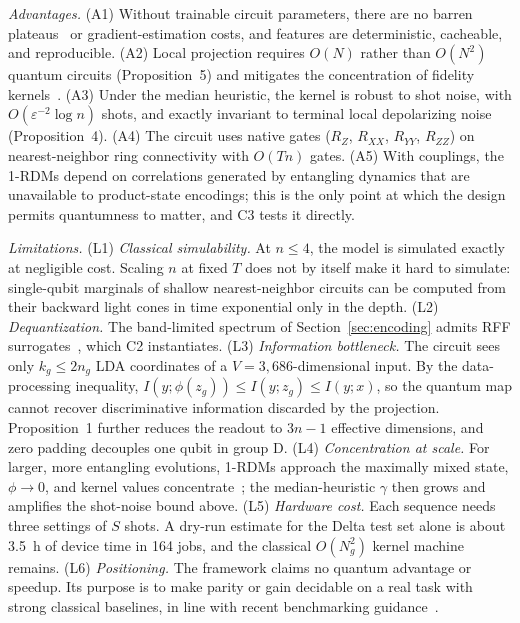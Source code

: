 \documentclass[conference]{IEEEtran}
\begin{document}
\textit{Advantages.} (A1) Without trainable circuit parameters, there are no barren plateaus~\cite{mcclean2018barren} or gradient-estimation costs, and features are deterministic, cacheable, and reproducible. (A2) Local projection requires $O(N)$ rather than $O(N^2)$ quantum circuits (Proposition~5) and mitigates the concentration of fidelity kernels~\cite{huang2021power}. (A3) Under the median heuristic, the kernel is robust to shot noise, with $O(\varepsilon^{-2}\log n)$ shots, and exactly invariant to terminal local depolarizing noise (Proposition~4). (A4) The circuit uses native gates ($R_Z$, $R_{XX}$, $R_{YY}$, $R_{ZZ}$) on nearest-neighbor ring connectivity with $O(Tn)$ gates. (A5) With couplings, the 1-RDMs depend on correlations generated by entangling dynamics that are unavailable to product-state encodings; this is the only point at which the design permits quantumness to matter, and C3 tests it directly.

\textit{Limitations.} (L1) \emph{Classical simulability.} At $n\le4$, the model is simulated exactly at negligible cost. Scaling $n$ at fixed $T$ does not by itself make it hard to simulate: single-qubit marginals of shallow nearest-neighbor circuits can be computed from their backward light cones in time exponential only in the depth. (L2) \emph{Dequantization.} The band-limited spectrum of Section~\ref{sec:encoding} admits RFF surrogates~\cite{schreiber2023surrogates,sweke2023rff}, which C2 instantiates. (L3) \emph{Information bottleneck.} The circuit sees only $k_g\le2n_g$ LDA coordinates of a $V=3{,}686$-dimensional input. By the data-processing inequality, $I(y;\phi(z_g))\le I(y;z_g)\le I(y;x)$, so the quantum map cannot recover discriminative information discarded by the projection. Proposition~1 further reduces the readout to $3n-1$ effective dimensions, and zero padding decouples one qubit in group D. (L4) \emph{Concentration at scale.} For larger, more entangling evolutions, 1-RDMs approach the maximally mixed state, $\phi\to0$, and kernel values concentrate~\cite{thanasilp2024concentration}; the median-heuristic $\gamma$ then grows and amplifies the shot-noise bound above. (L5) \emph{Hardware cost.} Each sequence needs three settings of $S$ shots. A dry-run estimate for the Delta test set alone is about 3.5~h of device time in 164 jobs, and the classical $O(N_g^2)$ kernel machine remains. (L6) \emph{Positioning.} The framework claims no quantum advantage or speedup. Its purpose is to make parity or gain decidable on a real task with strong classical baselines, in line with recent benchmarking guidance~\cite{bowles2024better}.
\end{document}
